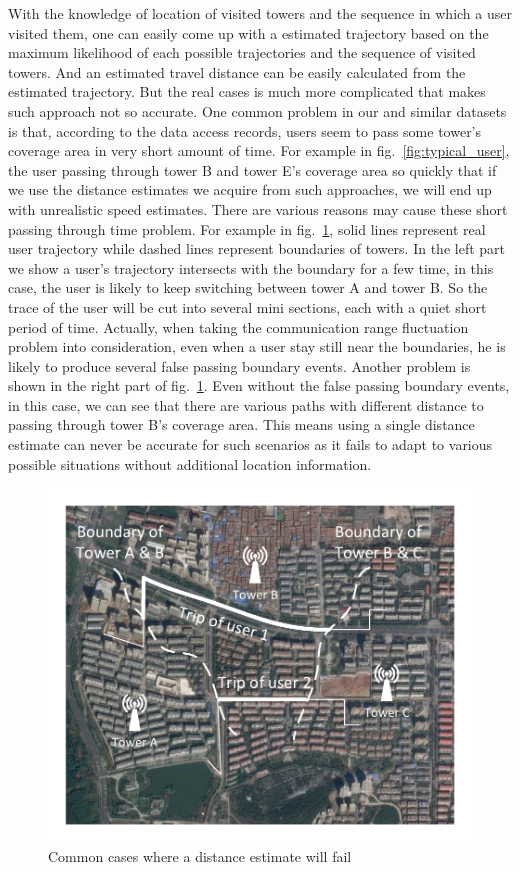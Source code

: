 With the knowledge of location of visited towers and the sequence in which a user visited them, one can easily come up with a estimated trajectory based on the maximum likelihood of each possible trajectories and the sequence of visited towers. And an estimated travel distance can be easily calculated from the estimated trajectory. But the real cases is much more complicated that makes such approach not so accurate. One common problem in our and similar datasets is that, according to the data access records, users seem to pass some tower's coverage area in very short amount of time. For example in fig.~\ref{fig:typical_user}, the user passing through tower B and tower E's coverage area so quickly that if we use the distance estimates we acquire from such approaches, we will end up with unrealistic speed estimates. There are various reasons may cause these short passing through time problem. For example in fig.~\ref{fig:illustrate_cases}, solid lines represent real user trajectory while dashed lines represent boundaries of towers. In the left part we show a user's trajectory intersects with the boundary for a few time, in this case, the user is likely to keep switching between tower A and tower B. So the trace of the user will be cut into several mini sections, each with a quiet short period of time. Actually, when taking the communication range fluctuation problem into consideration, even when a user stay still near the boundaries, he is likely to produce several false passing boundary events. Another problem is shown in the right part of fig.~\ref{fig:illustrate_cases}. Even without the false passing boundary events, in this case, we can see that there are various paths with different distance to passing through tower B's coverage area. This means using a single distance estimate can never be accurate for such scenarios as it fails to adapt to various possible situations without additional location information.

\begin{figure}[h]
    \centering
    \includegraphics[width=\linewidth]{./figures/illustrate_cases.pdf}
    \caption{Common cases where a distance estimate will fail}
    \label{fig:illustrate_cases}
\end{figure}

